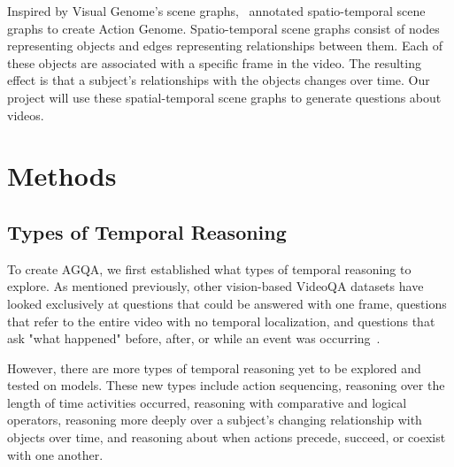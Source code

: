 \documentclass[10pt,twocolumn,letterpaper]{article}
\newcommand{\mgm}[1]{{\color{cyan}{mgm: #1}}}
\begin{document}
Inspired by Visual Genome's scene graphs,~\cite{ji2020action} annotated spatio-temporal scene graphs to create Action Genome. Spatio-temporal scene graphs consist of nodes representing objects and edges representing relationships between them. Each of these objects are associated with a specific frame in the video. The resulting effect is that a subject's relationships with the objects changes over time. Our project will use these spatial-temporal scene graphs to generate questions about videos. 

\section{Methods}

\subsection{Types of Temporal Reasoning}
To create AGQA, we first established what types of temporal reasoning to explore. As mentioned previously, other vision-based VideoQA datasets have looked exclusively at questions that could be answered with one frame, questions that refer to the entire video with no temporal localization, and questions that ask "what happened" before, after, or while an event was occurring~\cite{tapaswi2016movieqa,lei2018tvqa,jang2017tgif,kim2017deepstory,xu2017video,maharaj2017dataset,zeng2016leveraging,yu2019activitynet}. 


However, there are more types of temporal reasoning yet to be explored and tested on models. These new types include action sequencing, reasoning over the length of time activities occurred, reasoning with comparative and logical operators, reasoning more deeply over a subject's changing relationship with objects over time, and reasoning about when actions precede, succeed, or coexist with one another. 
\end{document}
